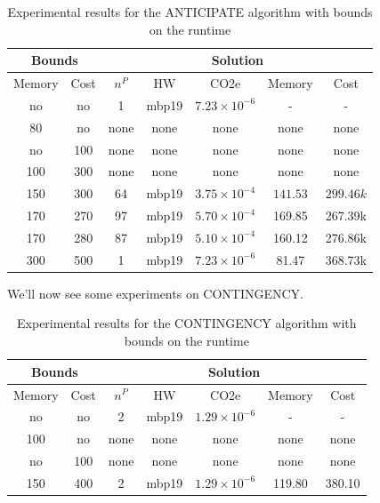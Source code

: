\documentclass[a4paper,singleside,12pt]{report} %
\begin{document}
\begin{table}[h!]
    \centering
    \begin{tabular}{|cc|ccccc|}
        \hline
        \multicolumn{2}{|c|}{Bounds} & \multicolumn{5}{c|}{Solution} \\
        \hline
        Memory & Cost & $n^P$ & HW & CO2e & Memory & Cost \\
        \hline
        no & no & 1 & mbp19 & $7.23 \times 10^{-6}$ & - & - \\
        80 & no & none & none & none & none & none \\
        no & 100 & none & none & none & none & none \\
        100 & 300 & none & none & none & none & none \\
        150 & 300 & 64 & mbp19 & $3.75 \times 10^{-4}$ & $141.53$ & $299.46k$ \\
        170 & 270 & 97 & mbp19 & $5.70 \times 10^{-4}$ & 169.85 & 267.39k \\
        170 & 280 & 87 & mbp19 & $5.10 \times 10^{-4}$ & 160.12 & 276.86k \\
        300 & 500 & 1 & mbp19 & $7.23 \times 10^{-6}$ & 81.47 & 368.73k \\
        \hline
    \end{tabular}
    \caption{Experimental results for the ANTICIPATE algorithm with bounds on the runtime}
    \label{tab:anticipate_results}
\end{table}

We'll now see some experiments on CONTINGENCY.

\begin{table}[h!]
    \centering
    \begin{tabular}{|cc|ccccc|}
        \hline
        \multicolumn{2}{|c|}{Bounds} & \multicolumn{5}{c|}{Solution} \\
        \hline
        Memory & Cost & $n^P$ & HW & CO2e & Memory & Cost \\
        \hline
        no & no & 2 & mbp19 & $1.29 \times 10^{-6}$ & - & - \\
        100 & no & none & none & none & none & none \\
        no & 100 & none & none & none & none & none \\
        150 & 400 & 2 & mbp19 & $1.29 \times 10^{-6}$ & 119.80 & 380.10 \\
        \hline
    \end{tabular}
    \caption{Experimental results for the CONTINGENCY algorithm with bounds on the runtime}
    \label{tab:contingency_results}
\end{table}
\end{document}
